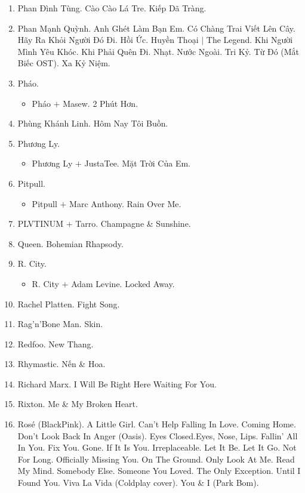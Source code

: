 \documentclass{article}
\begin{document}
\begin{enumerate}
	\item {\sc Phan Đình Tùng.} Cào Cào Lá Tre. Kiếp Dã Tràng.
	\item {\sc Phan Mạnh Quỳnh.} Anh Ghét Làm Bạn Em. Có Chàng Trai Viết Lên Cây. Hãy Ra Khỏi Người Đó Đi. Hồi Ức. Huyền Thoại $|$ The Legend. Khi Người Mình Yêu Khóc. Khi Phải Quên Đi. Nhạt. Nước Ngoài. Tri Kỷ. Từ Đó (Mắt Biếc OST). Xa Kỷ Niệm.
	\item {\sc Pháo.}
	\begin{itemize}
		\item {\sc Pháo $+$ Masew.} 2 Phút Hơn.
	\end{itemize}
	\item {\sc Phùng Khánh Linh.} Hôm Nay Tôi Buồn.
	\item {\sc Phương Ly.}
	\begin{itemize}
		\item {\sc Phương Ly $+$ JustaTee.} Mặt Trời Của Em.
	\end{itemize}
	\item {\sc Pitpull.}
	\begin{itemize}
		\item {\sc Pitpull $+$ Marc Anthony.} Rain Over Me.
	\end{itemize}
	\item {\sc PLVTINUM $+$ Tarro.} Champagne \& Sunshine.
	\item {\sc Queen.} Bohemian Rhapsody.
	\item {\sc R. City.}
	\begin{itemize}
		\item {\sc R. City $+$ Adam Levine.} Locked Away.
	\end{itemize}
	\item {\sc Rachel Platten.} Fight Song.
	\item {\sc Rag'n'Bone Man.} Skin.
	\item {\sc Redfoo.} New Thang.
	\item {\sc Rhymastic.} Nến \& Hoa.
	\item {\sc Richard Marx.} I Will Be Right Here Waiting For You.
	\item {\sc Rixton.} Me \& My Broken Heart.
	\item {\sc Ros\'e (BlackPink).} A Little Girl. Can't Help Falling In Love. Coming Home. Don't Look Back In Anger (Oasis). Eyes Closed.Eyes, Nose, Lips. Fallin' All In You. Fix You. Gone. If It Is You. Irreplaceable. Let It Be. Let It Go. Not For Long. Officially Missing You. On The Ground. Only Look At Me. Read My Mind. Somebody Else. Someone You Loved. The Only Exception. Until I Found You. Viva La Vida (Coldplay cover). You \& I (Park Bom).

\end{enumerate}
\end{document}
